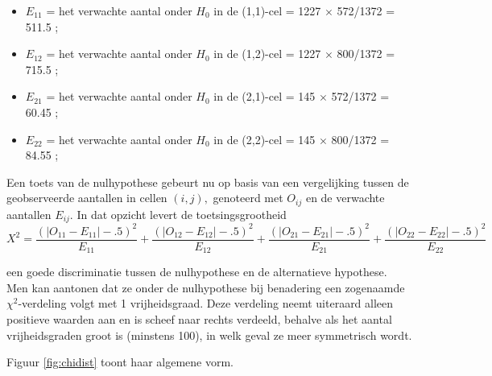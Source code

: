 \documentclass[12pt,dutch,coursenotes]{book}
\theoremstyle{definition}
\theoremstyle{definition}
\theoremstyle{definition}
\theoremstyle{remark}
\begin{document}
\begin{itemize}
\item
  \(E_{11}\) = het verwachte aantal onder \(H_0\) in de (1,1)-cel = 1227
  \(\times\) 572/1372 = 511.5 ;
\item
  \(E_{12}\) = het verwachte aantal onder \(H_0\) in de (1,2)-cel = 1227
  \(\times\) 800/1372 = 715.5 ;
\item
  \(E_{21}\) = het verwachte aantal onder \(H_0\) in de (2,1)-cel = 145
  \(\times\) 572/1372 = 60.45 ;
\item
  \(E_{22}\) = het verwachte aantal onder \(H_0\) in de (2,2)-cel = 145
  \(\times\) 800/1372 = 84.55 ;
\end{itemize}

Een toets van de nulhypothese gebeurt nu op basis van een vergelijking
tussen de geobserveerde aantallen in cellen \((i,j),\) genoteerd met
\(O_{ij}\) en de verwachte aantallen \(E_{ij}\). In dat opzicht levert
de toetsingsgrootheid\\

\begin{equation*}
X^2 = \frac{\left (|O_{11} - E_{11}| - .5 \right)^2 }{ E_{11}} + \frac{
\left ( |O_{12} - E_{12}| - .5 \right)^2 }{E_{12} }+ \frac{ \left ( |O_{21}
- E_{21}| - .5 \right)^2 }{E_{21}}+ \frac{ \left ( |O_{22} - E_{22}| - .5
\right)^2 }{E_{22} }
\end{equation*}

een goede discriminatie tussen de nulhypothese en de alternatieve
hypothese. Men kan aantonen dat ze onder de nulhypothese bij benadering
een zogenaamde \(\chi^2\)-verdeling volgt met 1 vrijheidsgraad. Deze
verdeling neemt uiteraard alleen positieve waarden aan en is scheef naar
rechts verdeeld, behalve als het aantal vrijheidsgraden groot is
(minstens 100), in welk geval ze meer symmetrisch wordt.

Figuur \ref{fig:chidist} toont haar algemene vorm.
\end{document}
